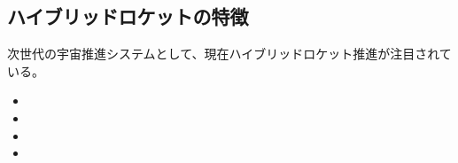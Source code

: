 \subsection{ハイブリッドロケットの特徴}
次世代の宇宙推進システムとして、現在ハイブリッドロケット推進が注目されている。

\begin{itemize}
	\item
	\item
	\item
	\item
\end{itemize}
